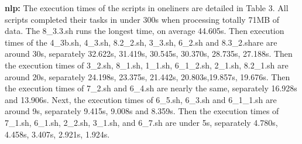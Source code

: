 \documentclass[sigplan, screen, 10pt]{acmart}
\begin{document}
\textbf{nlp:}
The execution times of the scripts in oneliners are detailed in Table 3.
All scripts completed their tasks in under 300s when processing totally 71MB of data.
The 8\_3.3.sh runs the longest time, on average 44.605s. Then execution times of  the 4\_3b.sh, 4\_3.sh, 8.2\_2.sh, 3\_3.sh, 6\_2.sh and 8.3\_2.share are around 30s, separately 32.622s, 31.419s, 30.545s, 30.370s,  28.735s, 27.188s.
Then the execution times of 3\_2.sh, 8\_1.sh, 1\_1.sh, 6\_1\_2.sh, 2\_1.sh, 8.2\_1.sh are around 20s, separately 24.198s, 23.375s, 21.442s, 20.803s,19.857s, 19.676s.
Then the execution times of 7\_2.sh and 6\_4.sh are nearly the same, separately 16.928s and 13.906s. Next, the execution times of 6\_5.sh, 6\_3.sh and 6\_1\_1.sh are around 9s, separately 9.415s,  9.008s and 8.359s. 
Then the execution times of 7\_1.sh, 6\_1.sh, 2\_2.sh, 3\_1.sh, and 6\_7.sh are under 5s, separately 4.780s, 4.458s,  3.407s, 2.921s, 1.924s.
\end{document}
